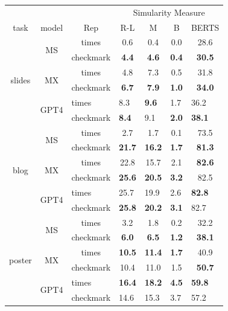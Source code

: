 \begin{table}[]
\begin{tabular}{ccc|cccc}
 &  &  & \multicolumn{4}{c}{Simularity Measure} \\
task & model & Rep & R-L & M & B & BERTS \\ \hline
\multirow{6}{*}{slides} & \multirow{2}{*}{MS} & times & 0.6 & 0.4 & 0.0 & 28.6 \\
 &  & checkmark & \textbf{4.4} & \textbf{4.6} & \textbf{0.4} & \textbf{30.5} \\ \cline{2-7} 
 & \multirow{2}{*}{MX} & times & 4.8 & 7.3 & 0.5 & 31.8 \\
 &  & checkmark & \textbf{6.7} & \textbf{7.9} & \textbf{1.0} & \textbf{34.0} \\ \cline{2-7} 
 & \multicolumn{1}{l}{\multirow{2}{*}{GPT4}} & \multicolumn{1}{l|}{times} & \multicolumn{1}{l}{8.3} & \multicolumn{1}{l}{\textbf{9.6}} & \multicolumn{1}{l}{1.7} & \multicolumn{1}{l}{36.2} \\
 & \multicolumn{1}{l}{} & \multicolumn{1}{l|}{checkmark} & \multicolumn{1}{l}{\textbf{8.4}} & \multicolumn{1}{l}{9.1} & \multicolumn{1}{l}{\textbf{2.0}} & \multicolumn{1}{l}{\textbf{38.1}} \\ \hline
\multirow{6}{*}{blog} & \multirow{2}{*}{MS} & times & 2.7 & 1.7 & 0.1 & 73.5 \\
 &  & checkmark & \textbf{21.7} & \textbf{16.2} & \textbf{1.7} & \textbf{81.3} \\ \cline{2-7} 
 & \multirow{2}{*}{MX} & times & 22.8 & 15.7 & 2.1 & \textbf{82.6} \\
 &  & checkmark & \textbf{25.6} & \textbf{20.5} & \textbf{3.2} & 82.5 \\ \cline{2-7} 
 & \multicolumn{1}{l}{\multirow{2}{*}{GPT4}} & \multicolumn{1}{l|}{times} & \multicolumn{1}{l}{25.7} & \multicolumn{1}{l}{19.9} & \multicolumn{1}{l}{2.6} & \multicolumn{1}{l}{\textbf{82.8}} \\
 & \multicolumn{1}{l}{} & \multicolumn{1}{l|}{checkmark} & \multicolumn{1}{l}{\textbf{25.8}} & \multicolumn{1}{l}{\textbf{20.2}} & \multicolumn{1}{l}{\textbf{3.1}} & \multicolumn{1}{l}{82.7} \\ \hline
\multirow{6}{*}{poster} & \multirow{2}{*}{MS} & times & 3.2 & 1.8 & 0.2 & 32.2 \\
 &  & checkmark & \textbf{6.0} & \textbf{6.5} & \textbf{1.2} & \textbf{38.1} \\ \cline{2-7} 
 & \multirow{2}{*}{MX} & times & \textbf{10.5} & \textbf{11.4} & \textbf{1.7} & 40.9 \\
 &  & checkmark & 10.4 & 11.0 & 1.5 & \textbf{50.7} \\ \cline{2-7} 
 & \multicolumn{1}{l}{\multirow{2}{*}{GPT4}} & \multicolumn{1}{l|}{times} & \multicolumn{1}{l}{\textbf{16.4}} & \multicolumn{1}{l}{\textbf{18.2}} & \multicolumn{1}{l}{\textbf{4.5}} & \multicolumn{1}{l}{\textbf{59.8}} \\
 & \multicolumn{1}{l}{} & \multicolumn{1}{l|}{checkmark} & \multicolumn{1}{l}{14.6} & \multicolumn{1}{l}{15.3} & \multicolumn{1}{l}{3.7} & \multicolumn{1}{l}{57.2}
\end{tabular}
\end{table}